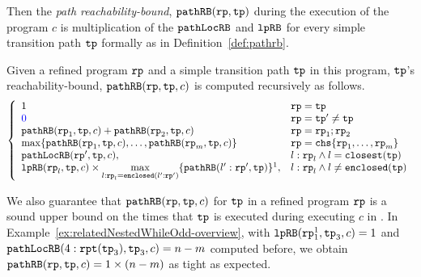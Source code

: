 Then the \emph{path reachability-bound}, $\mathtt{pathRB}(\mathtt{rp}, \mathtt{tp})$ during the execution of the program $c$ is multiplication of the $\mathtt{pathLocRB}$ and $\mathtt{lpRB}$ for every simple transition path $\mathtt{tp}$ formally as in Definition~\ref{def:pathrb}.
%
\begin{defn}
  \label{def:pathrb}
  Given a refined program $\mathtt{rp}$ and a simple transition path $\mathtt{tp}$ in this program, 
  $\mathtt{tp}$'s reachability-bound, $\mathtt{pathRB}(\mathtt{rp}, \mathtt{tp}, c)$
  is computed recursively as follows. 
{\small 
\[
  \left\{ 
  \begin{array}{ll}
    1  & \rprog = \tpath\\
    \highlight{0} & \rprog = \tpath' \neq \tpath\\
    \inoutB(\rprog_1, \tpath, c) + \inoutB(\rprog_2, \tpath, c) & \rprog = \rprog_1;\rprog_2 \\
    \max\left\{ \inoutB(\rprog_1, \tpath, c), \ldots, \inoutB(\rprog_m, \tpath, c) \right\} 
    & \rprog = \rpchoose{\rprog_1, \ldots, \rprog_m } \\
    \outinB(\rprog', \tpath, c), & l: \rprog_l \land l = \kw{closest}(\tpath) \\
    \lpchB(\rprog_l, \tpath , c)
    \times \max\limits_{l:\rprog_l = \kw{enclosed}(l':\rprog')}
   \{\inoutB(l':\rprog', \tpath)\} \footnotemark, & l: \rprog_l \land l \neq \kw{enclosed}(\tpath) \\
  \end{array}
  \right.
  \]
 }
 \end{defn}

We also guarantee that $\mathtt{pathRB}(\mathtt{rp}, \mathtt{tp}, c)$ for $\mathtt{tp}$ in a refined program $\mathtt{rp}$ is a sound upper bound on the times that $\mathtt{tp}$ is executed during executing $c$
in .
%
In Example~\ref{ex:relatedNestedWhileOdd-overview}, with $\mathtt{lpRB}(\mathtt{rp}_1^1, \mathtt{tp}_3, c) = 1$ and
$\mathtt{pathLocRB}(4: \mathtt{rpt}(\mathtt{tp}_3), \mathtt{tp}_3, c) = n - m$ computed before, we obtain $\mathtt{pathRB}(\mathtt{rp}, \mathtt{tp}, c) = 1 \times (n - m)$ as tight as expected.
